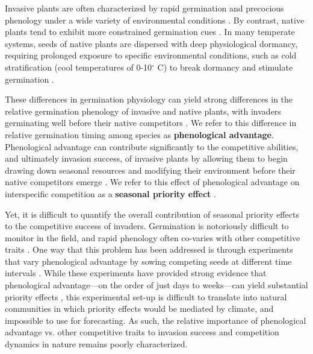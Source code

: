 \documentclass{article}[11pt]
\begin{document}
Invasive plants are often characterized by rapid germination and precocious phenology under a wide variety of environmental conditions \citep{Gioria2018,Gioria:2017wo,Wolkovich:2011uh,Smith:2013uj}. By contrast, native plants tend to exhibit more constrained germination cues \citep{Marushia:2010ug,Wainwright:2013tv,Van-Clef:2001to}. In many temperate systems, seeds of native plants are dispersed with deep physiological dormancy, requiring prolonged exposure to specific environmental conditions, such as cold stratification (cool temperatures of 0-10$^{\circ}$ C) to break dormancy and stimulate germination \citep{Brink:2013wr,Cavieres:2017aa,Bradford:2007tj}.

These differences in germination physiology can yield strong differences in the relative germination phenology of invasive and native plants, with invaders germinating well before their native competitors \citep{Gioria:2017wo}. We refer to this difference in relative germination timing among species as \textbf{phenological advantage}. Phenological advantage can contribute significantly to the competitive abilities, and ultimately invasion success, of invasive plants by allowing them to begin drawing down seasonal resources and modifying their environment before their native competitors emerge \citep{Kardol2013}. We refer to this effect of phenological advantage on interspecific competition as a \textbf{seasonal priority effect} \citep{Wainwright_2011}.

Yet, it is difficult to quantify the overall contribution of seasonal priority effects to the competitive success of invaders. Germination is notoriously difficult to monitor in the field, and rapid phenology often co-varies with other competitive traits \citep{Dickson2012,Milbau:2003vt,HAO:2009vh}. %
One way that this problem has been addressed is through experiments that vary phenological advantage by sowing competing seeds at different time intervals \citep{Young:2017aa}. While these experiments have provided strong evidence that phenological advantage---on the order of just days to weeks---can yield substantial priority effects \citep{Weidlich:2020aa}, this experimental set-up is difficult to translate into natural communities in which priority effects would be mediated by climate, and impossible to use for forecasting. As such, the relative importance of phenological advantage vs. other competitive traits to invasion success and competition dynamics in nature remains poorly characterized. 
\end{document}
